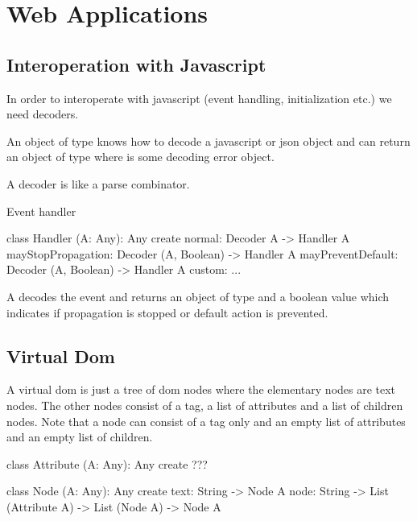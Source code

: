 \chapter{Web Applications}
\label{chapter:web}


\section{Interoperation with Javascript}

In order to interoperate with javascript (event handling, initialization etc.)
we need decoders.

An object of type  knows how to decode a javascript or json
object and can return an object of type  where
 is some decoding error object.

A decoder is like a parse combinator.


Event handler

\begin{alba}
    class
        Handler (A: Any): Any
    create
        normal: Decoder A -> Handler A
        mayStopPropagation: Decoder (A, Boolean) -> Handler A
        mayPreventDefault:  Decoder (A, Boolean) -> Handler A
        custom: ...
\end{alba}

A  decodes the event and returns an object of type
 and a boolean value which indicates if propagation is stopped or
default action is prevented.

\vskip 5mm
\section{Virtual Dom}

A virtual dom is just a tree of dom nodes where the elementary nodes are text
nodes. The other nodes consist of a tag, a list of attributes and a list of
children nodes. Note that a node can consist of a tag only and an empty list of
attributes and an empty list of children.

\begin{alba}
    class
        Attribute (A: Any): Any
    create
        ???

    class
        Node (A: Any): Any
    create
        text: String -> Node A
        node: String -> List (Attribute A) -> List (Node A) -> Node A
\end{alba}



